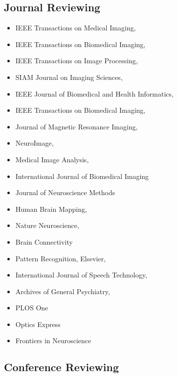 \documentclass[overlapped,line,letterpaper]{res}
\begin{document}
\begin{resume}
\subsection{Journal Reviewing}
    \begin{multicols}{2}
    \begin{itemize}
\item IEEE Transactions on Medical Imaging,
\item IEEE Transactions on Biomedical Imaging,
\item IEEE Transactions on Image Processing,
\item SIAM Journal on Imaging Sciences,
\item IEEE Journal of Biomedical and Health Informatics,
\item IEEE Transactions on Biomedical Imaging,
\item Journal of Magnetic Resonance Imaging,
\item NeuroImage,
\item Medical Image Analysis,
\item International Journal of Biomedical Imaging
\item Journal of Neuroscience Methods
\item Human Brain Mapping, 
\item Nature Neuroscience,
\item Brain Connectivity
\item Pattern Recognition, Elsevier,
\item International Journal of Speech Technology,
\item Archives of General Psychiatry,
\item PLOS One
\item Optics Express
\item Frontiers in Neuroscience
\end{itemize}
\end{multicols}
\subsection{Conference Reviewing}
    \begin{multicols}{2}
    \begin{itemize}


\end{itemize}
\end{multicols}
\end{resume}
\end{document}
